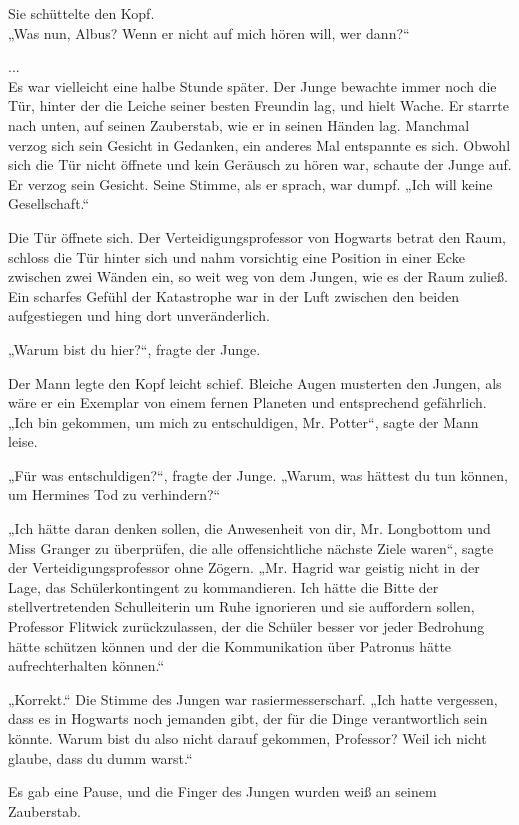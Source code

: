 {Sie schüttelte den Kopf.\\ „Was nun, Albus? Wenn er nicht auf mich hören will, wer dann?“

...\\ Es war vielleicht eine halbe Stunde später. Der Junge bewachte immer noch die Tür, hinter der die Leiche seiner besten Freundin lag, und hielt Wache. Er starrte nach unten, auf seinen Zauberstab, wie er in seinen Händen lag. Manchmal verzog sich sein Gesicht in Gedanken, ein anderes Mal entspannte es sich. Obwohl sich die Tür nicht öffnete und kein Geräusch zu hören war, schaute der Junge auf. Er verzog sein Gesicht. Seine Stimme, als er sprach, war dumpf. „Ich will keine Gesellschaft.“

Die Tür öffnete sich. Der Verteidigungsprofessor von Hogwarts betrat den Raum, schloss die Tür hinter sich und nahm vorsichtig eine Position in einer Ecke zwischen zwei Wänden ein, so weit weg von dem Jungen, wie es der Raum zuließ. Ein scharfes Gefühl der Katastrophe war in der Luft zwischen den beiden aufgestiegen und hing dort unveränderlich.

„Warum bist du hier?“, fragte der Junge.

Der Mann legte den Kopf leicht schief. Bleiche Augen musterten den Jungen, als wäre er ein Exemplar von einem fernen Planeten und entsprechend gefährlich.\\ „Ich bin gekommen, um mich zu entschuldigen, Mr. Potter“, sagte der Mann leise.

„Für was entschuldigen?“, fragte der Junge. „Warum, was hättest du tun können, um Hermines Tod zu verhindern?“

„Ich hätte daran denken sollen, die Anwesenheit von dir, Mr. Longbottom und Miss Granger zu überprüfen, die alle offensichtliche nächste Ziele waren“, sagte der Verteidigungsprofessor ohne Zögern. „Mr. Hagrid war geistig nicht in der Lage, das Schülerkontingent zu kommandieren. Ich hätte die Bitte der stellvertretenden Schulleiterin um Ruhe ignorieren und sie auffordern sollen, Professor Flitwick zurückzulassen, der die Schüler besser vor jeder Bedrohung hätte schützen können und der die Kommunikation über Patronus hätte aufrechterhalten können.“

„Korrekt.“ Die Stimme des Jungen war rasiermesserscharf. „Ich hatte vergessen, dass es in Hogwarts noch jemanden gibt, der für die Dinge verantwortlich sein könnte. Warum bist du also nicht darauf gekommen, Professor? Weil ich nicht glaube, dass du dumm warst.“

Es gab eine Pause, und die Finger des Jungen wurden weiß an seinem Zauberstab.

}
